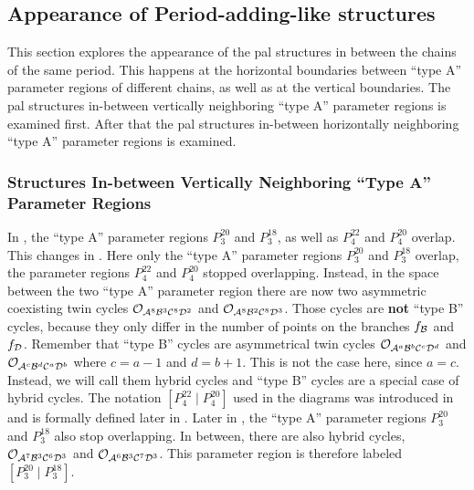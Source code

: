 \subsection{Appearance of Period-adding-like structures}
\label{sec:add.change.appa}


This section explores the appearance of the \gls{pal} structures in between the chains of the same period.
This happens at the horizontal boundaries between ``type A'' parameter regions of different chains, as well as at the vertical boundaries.
The \gls{pal} structures in-between vertically neighboring ``type A'' parameter regions is examined first.
After that the \gls{pal} structures in-between horizontally neighboring ``type A'' parameter regions is examined.

\subsubsection{ Structures In-between Vertically Neighboring ``Type A'' Parameter Regions}
\label{sec:add.change.appa.hor}

In , the ``type A'' parameter regions $P^{20}_3$ and $P^{18}_3$, as well as $P^{22}_4$ and $P^{20}_4$ overlap.
This changes in .
Here only the ``type A'' parameter regions $P^{20}_3$ and $P^{18}_3$ overlap, the parameter regions $P^{22}_4$ and $P^{20}_4$ stopped overlapping.
Instead, in the space between the two ``type A'' parameter region there are now two asymmetric coexisting twin cycles $\mathcal{O}_{\mathcal{A}^8\mathcal{B}^3\mathcal{C}^8\mathcal{D}^2}$ and $\mathcal{O}_{\mathcal{A}^8\mathcal{B}^2\mathcal{C}^8\mathcal{D}^3}$.
Those cycles are \textbf{not} ``type B'' cycles, because they only differ in the number of points on the branches $f_{\mathcal{B}}$ and $f_{\mathcal{D}}$.
Remember that ``type B'' cycles are asymmetrical twin cycles $\mathcal{O}_{\mathcal{A}^a\mathcal{B}^b\mathcal{C}^c\mathcal{D}^d}$ and $\mathcal{O}_{\mathcal{A}^c\mathcal{B}^d\mathcal{C}^a\mathcal{D}^b}$ where $c = a - 1$ and $d = b + 1$.
This is not the case here, since $a = c$.
Instead, we will call them hybrid cycles and ``type B'' cycles are a special case of hybrid cycles.
The notation $\left[P^{22}_4 \mid P^{20}_4\right]$ used in the diagrams was introduced in  and is formally defined later in .
Later in , the ``type A'' parameter regions $P^{20}_3$ and $P^{18}_3$ also stop overlapping.
In between, there are also hybrid cycles, $\mathcal{O}_{\mathcal{A}^7\mathcal{B}^3\mathcal{C}^6\mathcal{D}^3}$ and $\mathcal{O}_{\mathcal{A}^6\mathcal{B}^3\mathcal{C}^7\mathcal{D}^3}$.
This parameter region is therefore labeled $\left[P^{20}_3 \mid P^{18}_3\right]$.

